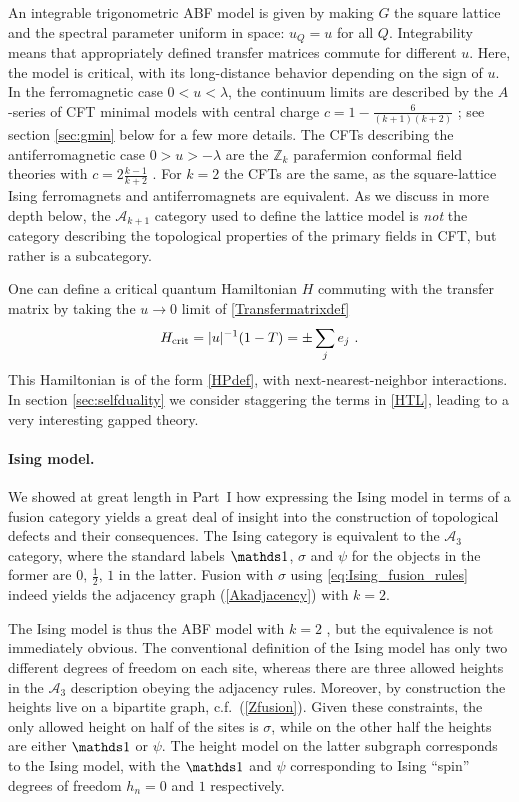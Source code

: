An integrable trigonometric ABF model is given by making $G$ the square lattice and the spectral parameter uniform in space: $u_Q=u$ for all $Q$. Integrability means that appropriately defined transfer matrices commute for different $u$.  Here, the model is critical, with its long-distance behavior depending on the sign of $u$. In the ferromagnetic case $0<u<\lambda$, the continuum limits are described by the $A$-series of CFT minimal models with central charge $c = 1 - \frac{6}{(k+1)(k+2)}$ \cite{BPZ:CFT:84, FQS84, Huse1984}; see section \ref{sec:gmin} below for a few more details. The CFTs describing the antiferromagnetic case $0>u>-\lambda$ are the $\mathbb{Z}_k$ parafermion conformal field theories with $c = 2\frac{k-1}{k+2}$ \cite{ZamoFateev:Parafermion:85}. 
For $k=2$ the CFTs are the same, as the square-lattice Ising ferromagnets and antiferromagnets are equivalent. 
As we discuss in more depth below, the $\mathcal{A}_{k+1}$ category used to define the lattice model is {\em not} the category describing the topological properties of the primary fields in CFT, but rather is a subcategory. 

One can define a critical quantum Hamiltonian $H$ commuting with the transfer matrix by taking the $u\to 0$ limit of \eqref{Transfermatrixdef}
\begin{align}
H_{\rm crit}= |u|^{-1} (1-T) =\pm \sum_j e_j\ .
\label{HTL}
\end{align}
This Hamiltonian is of the form \eqref{HPdef}, with next-nearest-neighbor interactions.
In section \ref{sec:selfduality} we consider staggering the terms in \eqref{HTL}, leading to a very interesting gapped theory.




\paragraph{Ising model.}
We showed at great length in Part~I how expressing the Ising model in terms of a fusion category yields a great deal of insight into the construction of topological defects and their consequences. 
The Ising category is equivalent to the $\mathcal{A}_3$ category, where the standard labels $\I$, $\sigma$ and $\psi$ for the objects in the former are $0,\,\tfrac12,\,1$ in the latter. Fusion with $\sigma$ using \eqref{eq:Ising_fusion_rules} indeed yields the adjacency graph (\ref{Akadjacency}) with $k=2$.

The Ising model is thus the ABF model with $k=2$ \cite{Andrews1984}, but the equivalence is not immediately obvious.
The conventional definition of the Ising model has only two different degrees of freedom on each site, whereas there are three allowed heights in the $\mathcal{A}_3$ description obeying the adjacency rules. Moreover, by construction the heights live on a bipartite graph, c.f.\ (\ref{Zfusion}).
Given these constraints, the only allowed height on half of the sites is $\sigma$, while on the other half the heights are either $\I$ or $\psi$.
The height model on the latter subgraph corresponds to the Ising model, with the $\I$ and $\psi$ corresponding to Ising ``spin'' degrees of freedom $h_n=0$ and $1$ respectively.


